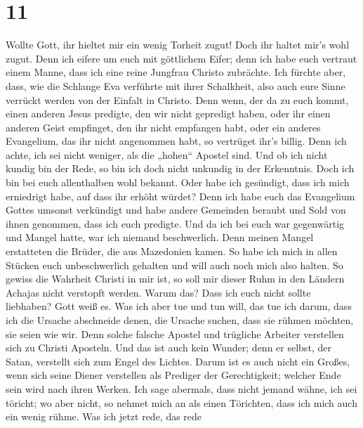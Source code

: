 \hypertarget{section-10}{%
\section{11}\label{section-10}}

 Wollte Gott, ihr hieltet mir ein wenig Torheit zugut!
Doch ihr haltet mir's wohl zugut.  Denn ich eifere um euch
mit göttlichem Eifer; denn ich habe euch vertraut einem Manne, dass ich
eine reine Jungfrau Christo zubrächte.  Ich fürchte aber,
dass, wie die Schlange Eva verführte mit ihrer Schalkheit, also auch
eure Sinne verrückt werden von der Einfalt in Christo. 
Denn wenn, der da zu euch kommt, einen anderen Jesus predigte, den wir
nicht gepredigt haben, oder ihr einen anderen Geist empfinget, den ihr
nicht empfangen habt, oder ein anderes Evangelium, das ihr nicht
angenommen habt, so vertrüget ihr's billig.  Denn ich
achte, ich sei nicht weniger, als die „hohen`` Apostel sind.
 Und ob ich nicht kundig bin der Rede, so bin ich doch
nicht unkundig in der Erkenntnis. Doch ich bin bei euch allenthalben
wohl bekannt.  Oder habe ich gesündigt, dass ich mich
erniedrigt habe, auf dass ihr erhöht würdet? Denn ich habe euch das
Evangelium Gottes umsonst verkündigt  und habe andere
Gemeinden beraubt und Sold von ihnen genommen, dass ich euch predigte.
 Und da ich bei euch war gegenwärtig und Mangel hatte, war
ich niemand beschwerlich. Denn meinen Mangel erstatteten die Brüder, die
aus Mazedonien kamen. So habe ich mich in allen Stücken euch
unbeschwerlich gehalten und will auch noch mich also halten.
 So gewiss die Wahrheit Christi in mir ist, so soll mir
dieser Ruhm in den Ländern Achajas nicht verstopft werden.
 Warum das? Dass ich euch nicht sollte liebhaben? Gott
weiß es.  Was ich aber tue und tun will, das tue ich
darum, dass ich die Ursache abschneide denen, die Ursache suchen, dass
sie rühmen möchten, sie seien wie wir.  Denn solche
falsche Apostel und trügliche Arbeiter verstellen sich zu Christi
Aposteln.  Und das ist auch kein Wunder; denn er selbst,
der Satan, verstellt sich zum Engel des Lichtes.  Darum
ist es auch nicht ein Großes, wenn sich seine Diener verstellen als
Prediger der Gerechtigkeit; welcher Ende sein wird nach ihren Werken.
 Ich sage abermals, dass nicht jemand wähne, ich sei
töricht; wo aber nicht, so nehmet mich an als einen Törichten, dass ich
mich auch ein wenig rühme.  Was ich jetzt rede, das rede
